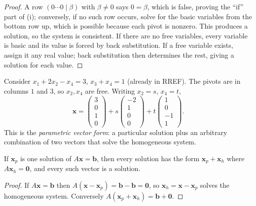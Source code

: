 \begin{proof}
A row $(0\cdots0\mid\beta)$ with $\beta\neq0$ says $0=\beta$, which is false, proving the ``if'' part of (i); conversely, if no such row occurs, solve for the basic variables from the bottom row up, which is possible because each pivot is nonzero. This produces a solution, so the system is consistent. If there are no free variables, every variable is basic and its value is forced by back substitution. If a free variable exists, assign it any real value; back substitution then determines the rest, giving a solution for each value.
\end{proof}

\begin{example}
Consider $x_1+2x_2-x_4=3$, $x_3+x_4=1$ (already in RREF). The pivots are in columns $1$ and $3$, so $x_2,x_4$ are free. Writing $x_2=s$, $x_4=t$,
\[ \mathbf{x}=\begin{pmatrix}3\\0\\1\\0\end{pmatrix}+s\begin{pmatrix}-2\\1\\0\\0\end{pmatrix}+t\begin{pmatrix}1\\0\\-1\\1\end{pmatrix}. \]
This is the \emph{parametric vector form}: a particular solution plus an arbitrary combination of two vectors that solve the homogeneous system.
\end{example}

\begin{theorem}[General solution = particular + homogeneous]\label{thm:partplushom}
If $\mathbf{x}_p$ is one solution of $A\mathbf{x}=\mathbf{b}$, then every solution has the form $\mathbf{x}_p+\mathbf{x}_h$ where $A\mathbf{x}_h=\mathbf{0}$, and every such vector is a solution.
\end{theorem}

\begin{proof}
If $A\mathbf{x}=\mathbf{b}$ then $A(\mathbf{x}-\mathbf{x}_p)=\mathbf{b}-\mathbf{b}=\mathbf{0}$, so $\mathbf{x}_h=\mathbf{x}-\mathbf{x}_p$ solves the homogeneous system. Conversely $A(\mathbf{x}_p+\mathbf{x}_h)=\mathbf{b}+\mathbf{0}$.
\end{proof}

